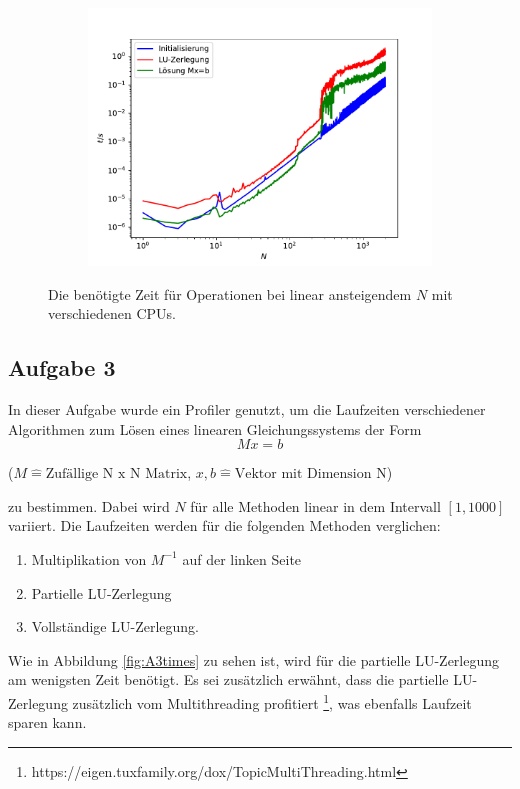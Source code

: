 \documentclass{scrartcl}
\begin{document}
\begin{figure}[h!]
\begin{subfigure}{0.4\textwidth}
		\includegraphics[width=\textwidth]{A2/Dann_halt_so/timers_lin_Prd.pdf}
		\end{subfigure}
		\caption{Die benötigte Zeit für Operationen bei linear ansteigendem $N$ mit verschiedenen CPUs.}
		\label{fig:time_lin}
        \end{figure}

        \FloatBarrier
        \subsection*{Aufgabe 3}
        In dieser Aufgabe wurde ein Profiler genutzt, um die Laufzeiten verschiedener Algorithmen zum Lösen eines linearen Gleichungssystems der Form 
        \begin{equation}
            Mx=b
        \end{equation}
        \begin{center}
            \tiny{($M \hat{=} \text{Zufällige N x N Matrix}$, $x, b \hat{=} \text{Vektor mit Dimension N}$)}
        \end{center}
        zu bestimmen. Dabei wird $N$ für alle Methoden linear in dem Intervall $[1, 1000]$ variiert. 
        Die Laufzeiten werden für die folgenden Methoden verglichen: 
        \begin{enumerate}
            \item Multiplikation von $M^{-1}$ auf der linken Seite \label{M1}
            \item Partielle LU-Zerlegung
            \item Vollständige LU-Zerlegung.
        \end{enumerate} 
        Wie in Abbildung \ref{fig:A3times} zu sehen ist, wird für die partielle LU-Zerlegung am wenigsten Zeit benötigt. Es sei zusätzlich erwähnt, dass die partielle LU-Zerlegung zusätzlich vom Multithreading profitiert \footnote[1]{https://eigen.tuxfamily.org/dox/TopicMultiThreading.html}, was ebenfalls Laufzeit sparen kann.
\end{document}
